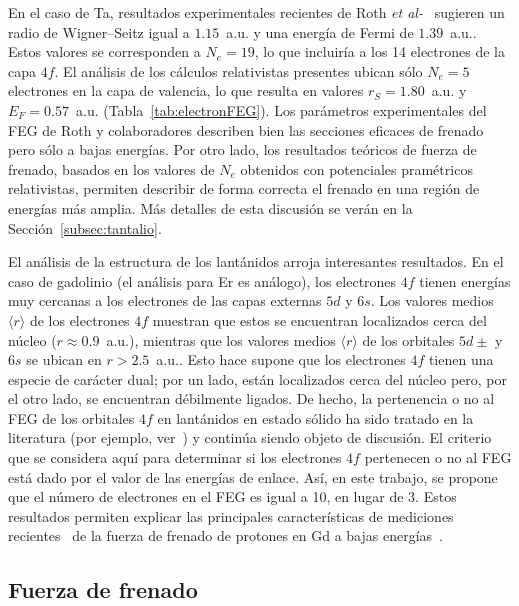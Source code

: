 En el caso de Ta, resultados experimentales recientes de Roth
\textit{et al-}~\cite{Roth:17} 
sugieren un radio de Wigner--Seitz igual a $1.15$~a.u. y una energía de 
Fermi de $1.39$~a.u.. Estos valores se corresponden a $N_e=19$, 
lo que incluiría a los 14 electrones de la capa $4f$. El análisis de 
los cálculos relativistas presentes ubican sólo $N_e=5$ electrones en la 
capa de valencia, lo que resulta en valores $r_S=1.80$~a.u. y 
$E_F=0.57$~a.u. (Tabla~\ref{tab:electronFEG}). Los parámetros 
experimentales del FEG de Roth y colaboradores describen bien las 
secciones eficaces de frenado pero sólo a bajas energías. Por otro lado, 
los resultados teóricos de fuerza de frenado, basados en los valores de 
$N_e$ obtenidos con potenciales pramétricos relativistas, permiten 
describir de forma correcta el frenado en una región de energías más 
amplia. Más detalles de esta discusión se verán en la 
Sección~\ref{subsec:tantalio}.

El análisis de la estructura de los lantánidos arroja interesantes 
resultados. En el caso de gadolinio (el análisis para Er es análogo), 
los electrones $4f$ tienen energías muy cercanas a los electrones de las 
capas externas $5d$ y $6s$. Los valores medios $\langle r\rangle$ de los 
electrones $4f$ muestran que estos se encuentran localizados cerca del 
núcleo (\mbox{$r\approx 0.9$~a.u.}), mientras que los valores medios 
$\langle r\rangle$ de los orbitales $5d\pm$ y $6s$ se ubican en 
\mbox{$r>2.5$~a.u.}. Esto hace supone que los electrones $4f$ tienen una 
especie de carácter dual; por un lado, están localizados cerca del 
núcleo pero, por el otro lado, se encuentran débilmente ligados. De 
hecho, la pertenencia o no al FEG de los orbitales $4f$ en lantánidos en 
estado sólido ha sido tratado en la 
literatura (por ejemplo, ver~\cite{Strange:99,Bonnelle:15}) y continúa 
siendo objeto de discusión. El criterio que se considera aquí para 
determinar si los electrones $4f$ pertenecen o no al FEG está dado por 
el valor de las energías de enlace. Así, en este trabajo, se propone que 
el número de electrones en el FEG es igual a 10, en lugar de 3. Estos 
resultados permiten explicar las principales características de 
mediciones recientes~\cite{Montanari:17} de la fuerza de frenado de 
protones en Gd a bajas energías~\cite{Roth:17}. 

\subsection{Fuerza de frenado}
\label{subsec:results-stopping}

